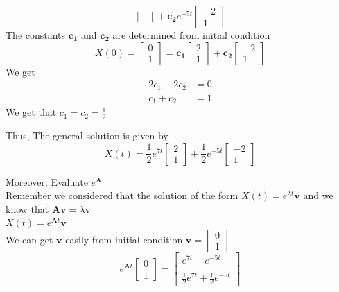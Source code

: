 \begin{example}
\[\begin{bmatrix}
        \end{bmatrix}
        + \mathbf{c_2}e^{-5t}\begin{bmatrix}
            -2 \\1
        \end{bmatrix}
    \]
    The constants $\mathbf{c_1}$ and $\mathbf{c_2}$ are determined from initial condition
    \[
        X(0) =\begin{bmatrix}
            0 \\1
        \end{bmatrix} =
        \mathbf{c_1} \begin{bmatrix}
            2 \\1
        \end{bmatrix}
        + \mathbf{c_2}\begin{bmatrix}
            -2 \\1
        \end{bmatrix}
    \]
    We get
    \begin{align*}
        2c_1 - 2 c_2 &= 0 
        \\
        c_1 + c_2 &= 1 
    \end{align*}
    We get that $c_1 =  c_2 = \frac{1}{2}$

    Thus, The general solution is given by
    \[
        X(t) =\frac{1}{2} e^{7t}\begin{bmatrix}
            2 \\1
        \end{bmatrix}
        +\frac{1}{2}e^{-5t}\begin{bmatrix}
            -2 \\1
        \end{bmatrix}
    \]
\end{example}
Moreover, Evaluate $e^{\mathbf{A}}$\\
Remember we considered that the solution of the form $X(t) = e^{\lambda t} \mathbf{v}$ and we know that $\mathbf{A}\mathbf{v} = \lambda \mathbf{v}$\\
$X(t) = e^{\mathbf{A} t} \mathbf{v}$\\
We can get $\mathbf{v}$ easily from initial condition $\mathbf{v} =
    \begin{bmatrix}
        0 \\
        1
    \end{bmatrix}
$
\[
    e^{\mathbf{A} t}
    \begin{bmatrix}
        0 \\
        1
    \end{bmatrix}=\begin{bmatrix}
        e^{7t}   -e^{-5t} 
        \\\\
        \frac{1}{2}e^{7t} + \frac{1}{2}e^{-5t}
    \end{bmatrix}    
\]
